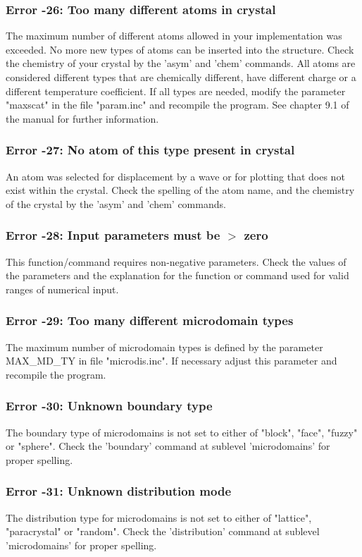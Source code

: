 \subsubsection{Error -26: Too many different atoms in crystal}
\par
The maximum number of different atoms allowed in your implementation 
was exceeded. No more new types of atoms can be inserted into the 
structure. Check the chemistry of your crystal by the 'asym' and 
'chem' commands. All atoms are considered different types that are 
chemically different, have different charge or a different temperature 
coefficient. If all types are needed, modify the parameter "maxscat" 
in the file "param.inc" and recompile the program. See chapter 9.1 
of the manual for further information. 
\subsubsection{Error -27: No atom of this type present in crystal}
\par
An atom was selected for displacement by a wave or for plotting that 
does not exist within the crystal. Check the spelling of the atom 
name, and the chemistry of the crystal by the 'asym' and 'chem' 
commands. 
\subsubsection{Error -28: Input parameters must be $> $ zero}
\par
This function/command requires non-negative parameters. 
Check the values of the parameters and the explanation for the function 
or command used for valid ranges of numerical input. 
\subsubsection{Error -29: Too many different microdomain types}
\par
The maximum number of microdomain types is defined by the parameter 
MAX\_MD\_TY in file "microdis.inc". If necessary adjust this parameter 
and recompile the program. 
\subsubsection{Error -30: Unknown boundary type}
\par
The boundary type of microdomains is not set to either of "block", 
"face", "fuzzy" or "sphere". Check the 'boundary' command at sublevel 
'microdomains' for proper spelling. 
\subsubsection{Error -31: Unknown distribution mode}
\par
The distribution type for microdomains is not set to either of 
"lattice", "paracrystal" or "random". Check the 'distribution' command 
at sublevel 'microdomains' for proper spelling. 
